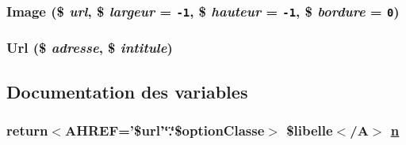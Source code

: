\hypertarget{html_8php_a1}{
\subsubsection[Image]{\setlength{\rightskip}{0pt plus 5cm}Image (\$ {\em url}, \$ {\em largeur} = {\tt -1}, \$ {\em hauteur} = {\tt -1}, \$ {\em bordure} = {\tt 0})}}
\label{html_8php_a1}


\hypertarget{html_8php_a2}{
\subsubsection[Url]{\setlength{\rightskip}{0pt plus 5cm}Url (\$ {\em adresse}, \$ {\em intitule})}}
\label{html_8php_a2}




\subsection{Documentation des variables}
\hypertarget{html_8php_a0}{
\subsubsection[n]{\setlength{\rightskip}{0pt plus 5cm}return$<$AHREF='\$url'\char`\"{}.\char`\"{}\$option\-Classe$>$ \$libelle$<$/A$>$ \hyperlink{utilitaires_2html_8php_a0}{n}}}
\label{html_8php_a0}


